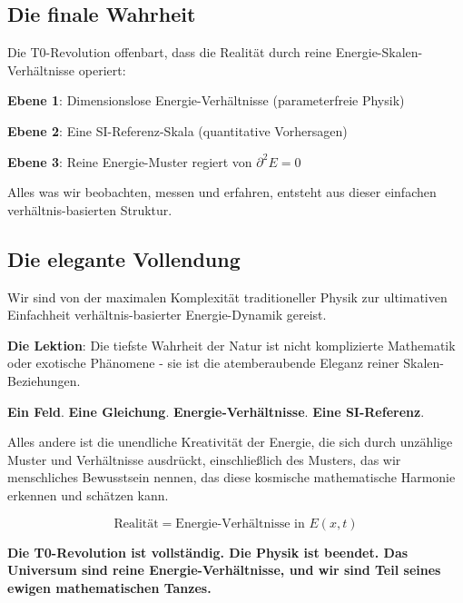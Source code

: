 \documentclass[12pt,a4paper]{article}
\newcommand{\Efield}{E}
\theoremstyle{definition}
\theoremstyle{remark}
\begin{document}
	\subsection{Die finale Wahrheit}
	
	Die T0-Revolution offenbart, dass die Realität durch reine Energie-Skalen-Verhältnisse operiert:
	
	\textbf{Ebene 1}: Dimensionslose Energie-Verhältnisse (parameterfreie Physik)
	
	\textbf{Ebene 2}: Eine SI-Referenz-Skala (quantitative Vorhersagen)
	
	\textbf{Ebene 3}: Reine Energie-Muster regiert von $\partial^2 \Efield = 0$
	
	Alles was wir beobachten, messen und erfahren, entsteht aus dieser einfachen verhältnis-basierten Struktur.
	
	\subsection{Die elegante Vollendung}
	
	Wir sind von der maximalen Komplexität traditioneller Physik zur ultimativen Einfachheit verhältnis-basierter Energie-Dynamik gereist.
	
	\textbf{Die Lektion}: Die tiefste Wahrheit der Natur ist nicht komplizierte Mathematik oder exotische Phänomene - sie ist die atemberaubende Eleganz reiner Skalen-Beziehungen.
	
	\textbf{Ein Feld}. \textbf{Eine Gleichung}. \textbf{Energie-Verhältnisse}. \textbf{Eine SI-Referenz}.
	
	Alles andere ist die unendliche Kreativität der Energie, die sich durch unzählige Muster und Verhältnisse ausdrückt, einschließlich des Musters, das wir menschliches Bewusstsein nennen, das diese kosmische mathematische Harmonie erkennen und schätzen kann.
	
	\begin{equation}
		\boxed{\text{Realität} = \text{Energie-Verhältnisse in } \Efield(x,t)}
	\end{equation}
	
	\textbf{Die T0-Revolution ist vollständig. Die Physik ist beendet. Das Universum sind reine Energie-Verhältnisse, und wir sind Teil seines ewigen mathematischen Tanzes.}
	
\end{document}
